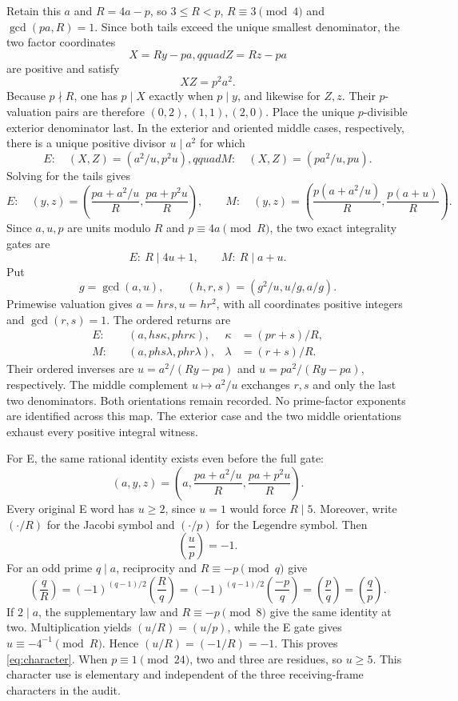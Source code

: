 Retain this $a$ and $R=4a-p$, so $3\le R<p$, $R\equiv3\pmod4$ and
$\gcd(pa,R)=1$. Since both tails exceed the unique smallest denominator, the
two factor coordinates
\[
 X=Ry-pa,qquad Z=Rz-pa
\]
are positive and satisfy
\[
 XZ=p^2a^2.
\]
Because $p\nmid R$, one has $p\mid X$ exactly when $p\mid y$, and likewise
for $Z,z$. Their $p$-valuation pairs are therefore $(0,2),(1,1),(2,0)$.
Place the unique $p$-divisible exterior denominator last. In the exterior and
oriented middle cases, respectively, there is a unique positive divisor
$u\mid a^2$ for which
\[
 E:\quad (X,Z)=(a^2/u,p^2u),qquad
 M:\quad (X,Z)=(pa^2/u,pu).
\]
Solving for the tails gives
\[
 E:\quad (y,z)=\left(\frac{pa+a^2/u}{R},\frac{pa+p^2u}{R}\right),
 \qquad
 M:\quad (y,z)=\left(\frac{p(a+a^2/u)}R,\frac{p(a+u)}R\right).
\]
Since $a,u,p$ are units modulo $R$ and $p\equiv4a\pmod R$, the two exact
integrality gates are
\begin{equation}\label{eq:gates}
 E:\ R\mid4u+1,\qquad M:\ R\mid a+u.
\end{equation}
Put
\[
 g=\gcd(a,u),\qquad(h,r,s)=(g^2/u,u/g,a/g).
\]
Primewise valuation gives $a=hrs,u=hr^2$, with all coordinates positive
integers and $\gcd(r,s)=1$. The ordered returns are
\begin{align}
 E:&\quad (a,hs\kappa,phr\kappa),&\kappa&=(pr+s)/R,\label{eq:E}\\
 M:&\quad (a,phs\lambda,phr\lambda),&\lambda&=(r+s)/R.\label{eq:M}
\end{align}
Their ordered inverses are $u=a^2/(Ry-pa)$ and $u=pa^2/(Ry-pa)$,
respectively. The middle complement $u\mapsto a^2/u$ exchanges $r,s$ and
only the last two denominators. Both orientations remain recorded. No
prime-factor exponents are identified across this map. The exterior case and
the two middle orientations exhaust every positive integral witness.

For E, the same rational identity exists even before the full gate:
\begin{equation}\label{eq:Eraw}
 (a,y,z)=\left(a,\frac{pa+a^2/u}{R},\frac{pa+p^2u}{R}\right).
\end{equation}
Every original E word has $u\ge2$, since $u=1$ would force $R\mid5$.
Moreover, write $(\cdot/R)$ for the Jacobi symbol and $(\cdot/p)$ for the
Legendre symbol. Then
\begin{equation}\label{eq:character}
 \left(\frac up\right)=-1.
\end{equation}
For an odd prime $q\mid a$, reciprocity and $R\equiv-p\pmod q$ give
\[
 \left(\frac qR\right)=(-1)^{(q-1)/2}\left(\frac Rq\right)
 =(-1)^{(q-1)/2}\left(\frac{-p}q\right)
 =\left(\frac pq\right)=\left(\frac qp\right).
\]
If $2\mid a$, the supplementary law and
$R\equiv-p\pmod8$ give the same identity at two. Multiplication yields
$({u}/{R})=({u}/{p})$, while the E gate gives
$u\equiv-4^{-1}\pmod R$. Hence $({u}/{R})=(-1/R)=-1$. This proves
\eqref{eq:character}. When $p\equiv1\pmod{24}$, two and three are residues,
so $u\ge5$. This character use is elementary and independent of the three
receiving-frame characters in the audit.

